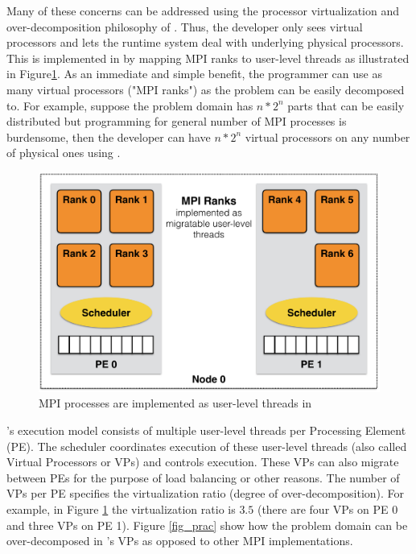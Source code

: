\documentclass[10pt]{article}
\begin{document}
Many of these concerns can be addressed using the processor virtualization and 
over-decomposition philosophy of \charmpp{}. Thus, the developer only sees 
virtual processors and lets the runtime system deal with underlying physical 
processors. This is implemented in \ampi{} by mapping MPI ranks to \charmpp{}
user-level threads as illustrated in Figure\ref{fig_virt}. As an immediate and
simple benefit, the programmer can use as many virtual processors ("MPI ranks")
as the problem can be easily decomposed to. For example, suppose the problem
domain has $n*2^n$ parts that can be easily distributed but programming for
general number of MPI processes is burdensome, then the developer can have
$n*2^n$ virtual processors on any number of physical ones using \ampi{}.
  
\begin{figure}[h]
\centering
\includegraphics[width=4.6in]{figs/virtualization.png}
\caption{MPI processes are implemented as user-level threads in \ampi{}}
\label{fig_virt}
\end{figure}

\ampi{}'s execution model consists of multiple user-level threads per Processing Element (PE).
The \charmpp{} scheduler coordinates
execution of these user-level threads (also called Virtual Processors or VPs) and controls
execution. These VPs can also migrate between
PEs for the purpose of load balancing or other reasons. The number of VPs
per PE specifies the virtualization ratio (degree of over-decomposition).
For example, in Figure \ref{fig_virt} the virtualization ratio is $3.5$ (there are
four VPs on PE 0 and three VPs on PE 1). Figure \ref{fig_prac} show how the problem domain
can be over-decomposed in \ampi{}'s VPs as opposed to other MPI implementations.
\end{document}
